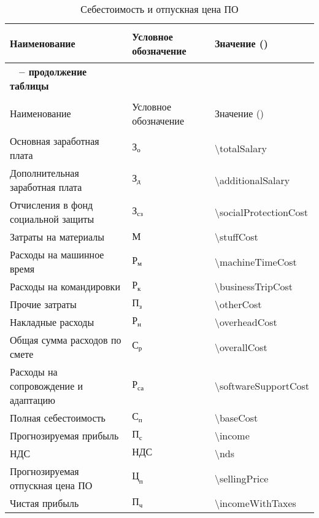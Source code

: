 \begin{longtable}{| >{\raggedright}m{}
                  | >{\centering}m{}
                  | >{\centering\arraybackslash}m{}|}
\caption{Себестоимость и отпускная цена ПО}
\label{table:econ:selfprice} \\

\hline
{\begin{center}
  Наименование
\end{center} } & Условное обозначение & Значение (\byr{}) \\
\endfirsthead

\multicolumn{3}{l}%
{{\bfseries \tablename\ \thetable{} -- продолжение таблицы}} \\
\hline
{\begin{center}
  Наименование
\end{center} } & Условное обозначение & Значение (\byr{}) \\
\endhead

\hline
Основная заработная плата & $\text{З}_{\text{о}}$ & \num{\totalSalary} \\
\hline
Дополнительная заработная плата & $\text{З}_{\text{д}}$ & \num{\additionalSalary} \\
\hline
Отчисления в фонд социальной защиты & $\text{З}_{\text{сз}}$ &\num{\socialProtectionCost} \\
\hline
Затраты на материалы & $\text{М}$ &\num{\stuffCost} \\
\hline
Расходы на машинное время & $\text{Р}_{\text{м}}$ &\num{\machineTimeCost} \\
\hline
Расходы на командировки & $\text{Р}_{\text{к}}$ &\num{\businessTripCost} \\
\hline
Прочие затраты & $\text{П}_{\text{з}}$ &\num{\otherCost} \\
\hline
Накладные расходы & $\text{Р}_{\text{н}}$ &\num{\overheadCost} \\
\hline
Общая сумма расходов по смете & $\text{С}_{\text{р}}$ &\num{\overallCost} \\
\hline
Расходы на сопровождение и адаптацию & $\text{Р}_{\text{са}}$ &\num{\softwareSupportCost} \\
\hline
Полная себестоимость & $\text{С}_{\text{п}}$ &\num{\baseCost} \\
\hline
Прогнозируемая прибыль & $\text{П}_{\text{с}}$ &\num{\income} \\
\hline
НДС & $\text{НДС}$ &\num{\nds} \\
\hline
Прогнозируемая отпускная цена ПО & $\text{Ц}_{\text{п}}$ &\num{\sellingPrice} \\
\hline
Чистая прибыль & $\text{П}_{\text{ч}}$ &\num{\incomeWithTaxes} \\
\hline
\end{longtable}
\hfill

